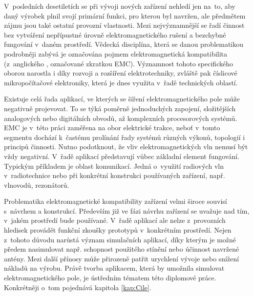 
V~posledních desetiletích se při vývoji nových zařízení nehledí jen na~to, aby daný výrobek plnil svojí primární funkci, pro kterou byl navržen, ale předmětem zájmu jsou také ostatní provozní vlastnosti. Mezi nejvýznamnější se řadí činnost bez vytváření nepřípustné úrovně elektromagnetického rušení a bezchybné fungování v~daném prostředí. Vědecká disciplína, která se danou problematikou podrobněji zabývá je označována pojmem elektromagnetická kompatibilita (z~anglického , označované zkratkou EMC). Významnost tohoto specifického oborou narostla i díky rozvoji a rozšíření elektrotechniky, zvláště pak číslicové mikropočítačové elektroniky, která je dnes využita v~řadě technických oblastí.

Existuje celá řada aplikací, ve kterých se šíření elektromagnetického pole může negativně projevovat. To se týká poměrně jednoduchých zapojení, složitějších analogových nebo digitálních obvodů, až komplexních procesorových systémů. EMC je v~této práci zaměřena na obor elektrické trakce, neboť v~tomto segmentu dochází k~častému prolínání řady systémů různých výkonů, topologií i principů činnosti. Nutno podotknout, že vliv elektromagnetických vln nemusí být vždy negativní. V~řadě aplikací představují vůbec základní element fungování. Typickým příkladem je oblast komunikací. Jedná o~využití radiových vln v~radiotechnice nebo při konkrétní konstrukci používaných zařízení, např. vlnovodů, rezonátorů.

Problematika elektromagnetické kompatibility zařízení velmi široce souvisí s~návrhem a konstrukcí. Především již ve fázi návrhu zařízení se uvažuje nad tím, v~jakém prostředí bude používané. V~řadě aplikací ale nelze z~provozních hledisek provádět funkční zkoušky prototypů v~konkrétním prostředí. Nejen z~tohoto důvodu narůstá význam simulačních aplikací, díky kterým je možné předem nasimulovat např. schopnost použitého stínění nebo účinnost navržené antény. Mezi další přínosy může přirozeně patřit urychlení vývoje nebo snížení nákladů na výrobu. Právě tvorba aplikacem, která by umožnila simulovat elektromagnetického pole, je ústředním tématem této diplomové práce. Konkrétněji o~tom pojednává kapitola \ref{kap:Cile}.


